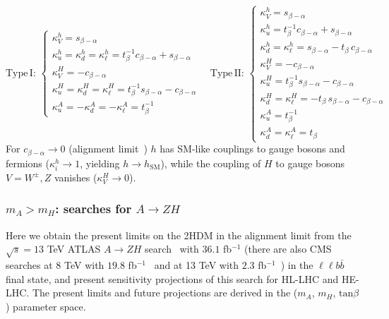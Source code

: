 \documentclass[../report.tex]{subfiles}
\begin{document}
 \begin{equation}
 \label{t:kappas}
 \mathrm{Type}\,\mathrm{I}:\,\left\lbrace
 \begin{array}{l}
 \kappa^h_V = s_{\beta-\alpha} \\
 \kappa^h_u = \kappa^h_d = \kappa^h_{\ell} = t^{-1}_{\beta}c_{\beta-\alpha} + s_{\beta-\alpha}  \\
 \kappa^{H}_V = - c_{\beta-\alpha} \\
 \kappa^{H}_u = \kappa^{H}_d = \kappa^{H}_{\ell} = t^{-1}_{\beta}s_{\beta-\alpha} - c_{\beta-\alpha}  \\
 \kappa^{A}_u = - \kappa^{A}_d = - \kappa^{A}_{\ell} = t^{-1}_{\beta}
 \end{array}
 \right.
 \quad
  \mathrm{Type}\,\mathrm{II}:\,\left\lbrace
 \begin{array}{l}
 \kappa^h_V = s_{\beta-\alpha} \\
 \kappa^h_u = t^{-1}_{\beta}c_{\beta-\alpha} + s_{\beta-\alpha}  \\
 \kappa^h_d = \kappa^h_{\ell} = s_{\beta-\alpha} - t_{\beta}\,c_{\beta-\alpha}\\
 \kappa^{H}_V = - c_{\beta-\alpha} \\
 \kappa^{H}_u = t^{-1}_{\beta}s_{\beta-\alpha} - c_{\beta-\alpha}  \\
 \kappa^{H}_d = \kappa^{H}_{\ell} = -t_{\beta}\,s_{\beta-\alpha} - c_{\beta-\alpha}  \\
 \kappa^{A}_u = t^{-1}_{\beta}\\
 \kappa^{A}_d = \kappa^{A}_{\ell} = t_{\beta}
 \end{array}
 \right.
\end{equation}
%
For $c_{\beta -\alpha} \to 0$ (alignment limit~\cite{Gunion:2002zf}) 
$h$ has SM-like couplings to gauge bosons and fermions ($\kappa^h_i \to 1$, yielding $h \to h_{\mathrm{SM}}$), while the coupling of $H$ to gauge bosons $V = W^{\pm},Z$ vanishes ($\kappa^{H}_V \to 0$).

\subsubsection{$m_A > m_H$: searches for $A \to Z H$}

Here we obtain the present limits on the 2HDM in the alignment limit from the $\sqrt{s} = 13$ TeV ATLAS $A \to Z H$ search~\cite{Aaboud:2018eoy} with $36.1$ fb$^{-1}$ (there are also CMS searches at 8 TeV with $19.8$ fb$^{-1}$~\cite{Khachatryan:2016are} and at 13 TeV with $2.3$ fb$^{-1}$~\cite{CMS:2016qxc}) in the $\ell \ell b \bar{b}$ final state, and present sensitivity projections of this search for HL-LHC and HE-LHC. The present limits and future projections are derived in the ($m_A$, $m_H$, $\mathrm{tan}\beta$) parameter space. 
\end{document}
